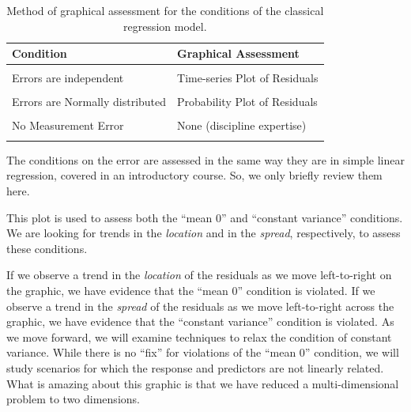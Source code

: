 \documentclass[
  letterpaper,
  DIV=11,
  numbers=noendperiod]{scrreprt}
\theoremstyle{definition}
\theoremstyle{definition}
\theoremstyle{remark}
\begin{document}
\hypertarget{tbl-glm-assessing-conditions-residual-plots}{}
\begin{table}
\caption{\label{tbl-glm-assessing-conditions-residual-plots}Method of graphical assessment for the conditions of the classical
regression model. }\tabularnewline

\centering
\begin{tabular}[t]{ll}
\toprule
Condition\cellcolor{gray!10}{} & \cellcolor{gray!10}{}Graphical Assessment\\
\midrule
\cellcolor{gray!10}{Error is 0, on average, for all predictors} & \cellcolor{gray!10}{Residual vs. Predicted Values}\\
Errors are independent & Time-series Plot of Residuals\\
\cellcolor{gray!10}{Homoskedasticity} & \cellcolor{gray!10}{Residual vs. Predicted Values}\\
Errors are Normally distributed & Probability Plot of Residuals\\
 & \\
\addlinespace
No Measurement Error & None (discipline expertise)\\
\cellcolor{gray!10}{Predictor enters linearly} & \cellcolor{gray!10}{Residual vs. Predictor}\\
\bottomrule
\end{tabular}
\end{table}

The conditions on the error are assessed in the same way they are in
simple linear regression, covered in an introductory course. So, we only
briefly review them here.

\begin{tcolorbox}[enhanced jigsaw, left=2mm, toprule=.15mm, arc=.35mm, breakable, opacitybacktitle=0.6, opacityback=0, rightrule=.15mm, colbacktitle=quarto-callout-note-color!10!white, coltitle=black, leftrule=.75mm, toptitle=1mm, colframe=quarto-callout-note-color-frame, titlerule=0mm, title=\textcolor{quarto-callout-note-color}{\faInfo}\hspace{0.5em}{Using the Plot of the Residuals vs.~Predicted Values}, bottomrule=.15mm, colback=white, bottomtitle=1mm]

This plot is used to assess both the ``mean 0'' and ``constant
variance'' conditions. We are looking for trends in the \emph{location}
and in the \emph{spread}, respectively, to assess these conditions.

\end{tcolorbox}

If we observe a trend in the \emph{location} of the residuals as we move
left-to-right on the graphic, we have evidence that the ``mean 0''
condition is violated. If we observe a trend in the \emph{spread} of the
residuals as we move left-to-right across the graphic, we have evidence
that the ``constant variance'' condition is violated. As we move
forward, we will examine techniques to relax the condition of constant
variance. While there is no ``fix'' for violations of the ``mean 0''
condition, we will study scenarios for which the response and predictors
are not linearly related. What is amazing about this graphic is that we
have reduced a multi-dimensional problem to two dimensions.
\end{document}
